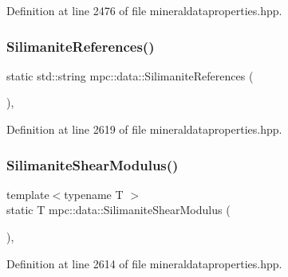 Definition at line 2476 of file mineraldataproperties.\+hpp.

\mbox{\label{namespacempc_1_1data_a9aa0d41289dbb515bb72e1887c096e60}} 
\subsubsection{\texorpdfstring{Silimanite\+References()}{SilimaniteReferences()}}
{\footnotesize\ttfamily static std\+::string mpc\+::data\+::\+Silimanite\+References (\begin{DoxyParamCaption}{ }\end{DoxyParamCaption})\hspace{0.3cm}{\ttfamily [inline]}, {\ttfamily [static]}}



Definition at line 2619 of file mineraldataproperties.\+hpp.

\mbox{\label{namespacempc_1_1data_a1166a34cdb032fb9cd3b1125ddcd3f2a}} 
\subsubsection{\texorpdfstring{Silimanite\+Shear\+Modulus()}{SilimaniteShearModulus()}}
{\footnotesize\ttfamily template$<$typename T $>$ \\
static T mpc\+::data\+::\+Silimanite\+Shear\+Modulus (\begin{DoxyParamCaption}{ }\end{DoxyParamCaption})\hspace{0.3cm}{\ttfamily [inline]}, {\ttfamily [static]}}



Definition at line 2614 of file mineraldataproperties.\+hpp.

\mbox{\label{namespacempc_1_1data_aae2a34fe404434da8c2b2d69f70c2f48}} 
